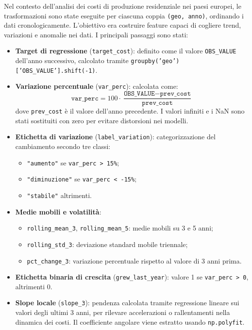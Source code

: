 \documentclass[conference]{IEEEtran}
\begin{document}
Nel contesto dell’analisi dei costi di produzione residenziale nei paesi europei, le trasformazioni sono state eseguite per ciascuna coppia \texttt{(geo, anno)}, ordinando i dati cronologicamente. L’obiettivo era costruire feature capaci di cogliere trend, variazioni e anomalie nei dati. I principali passaggi sono stati:

{\raggedright
\begin{itemize}
    \item \textbf{Target di regressione} (\texttt{target\_cost}): definito come il valore \texttt{OBS\_VALUE} dell’anno successivo, calcolato tramite \texttt{groupby('geo')['OBS\_VALUE'].shift(-1)}.
    
    \item \textbf{Variazione percentuale} (\texttt{var\_perc}): calcolata come:
    \[
    \texttt{var\_perc} = 100 \cdot \frac{\texttt{OBS\_VALUE} - \texttt{prev\_cost}}{\texttt{prev\_cost}}
    \]
    dove \texttt{prev\_cost} è il valore dell’anno precedente. I valori infiniti e i NaN sono stati sostituiti con zero per evitare distorsioni nei modelli.
   
    \item \textbf{Etichetta di variazione} (\texttt{label\_variation}): categorizzazione del cambiamento secondo tre classi:
    \begin{itemize}
        \item \texttt{"aumento"} se \texttt{var\_perc > 15\%};
        \item \texttt{"diminuzione"} se \texttt{var\_perc < -15\%};
        \item \texttt{"stabile"} altrimenti.
    \end{itemize}
    
    \item \textbf{Medie mobili e volatilità}:
    \begin{itemize}
        \item \texttt{rolling\_mean\_3}, \texttt{rolling\_mean\_5}: medie mobili su 3 e 5 anni;
        \item \texttt{rolling\_std\_3}: deviazione standard mobile triennale;
        \item \texttt{pct\_change\_3}: variazione percentuale rispetto al valore di 3 anni prima.
    \end{itemize}
    
    \item \textbf{Etichetta binaria di crescita} (\texttt{grew\_last\_year}): valore 1 se \texttt{var\_perc > 0}, altrimenti 0.
    
    \item \textbf{Slope locale} (\texttt{slope\_3}): pendenza calcolata tramite regressione lineare sui valori degli ultimi 3 anni, per rilevare accelerazioni o rallentamenti nella dinamica dei costi. Il coefficiente angolare viene estratto usando \texttt{np.polyfit}.
\end{itemize}
} 
\end{document}
